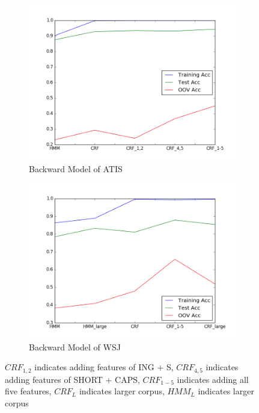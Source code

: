 \documentclass[journal, a4paper]{IEEEtran}
\begin{document}
\begin{figure}
        \begin{subfigure}[b]{0.24\textwidth}
                \includegraphics[width=\linewidth]{atisB}
                \caption{Backward Model of ATIS}
                \label{fig:tiger}
        \end{subfigure}%
        \hspace{\fill}
        \begin{subfigure}[b]{0.24\textwidth}
                \includegraphics[width=\linewidth]{wsjB}
                \caption{Backward Model of WSJ}
                \label{fig:mouse}
        \end{subfigure}
        \caption{$CRF_{1,2}$ indicates adding features of ING + S, $CRF_{4,5}$ indicates adding features of SHORT + CAPS, $CRF_{1-5}$ indicates adding all five features, $CRF_{L}$ indicates larger corpus, $HMM_{L}$ indicates larger corpus}\label{fig:animals}
\vspace{-2mm}
\end{figure}
\end{document}
